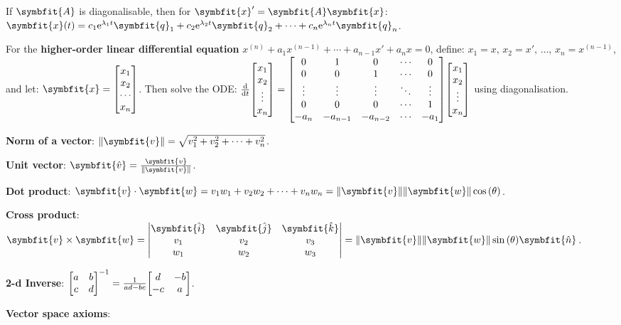 \documentclass{article}
\begin{document}
\noindent If $\symbfit{A}$ is diagonalisable, then for 
$\symbfit{x}' = \symbfit{A} \symbfit{x}$: $\symbfit{x}(t) 
= c_1 \e^{\lambda_1 t} \symbfit{q}_1 + c_2 \e^{\lambda_2 t} \symbfit{q}_2 + 
\cdots + c_n \e^{\lambda_n t} \symbfit{q}_n$.
	
\noindent For the \textbf{higher-order linear differential equation} 
$x^{\left( n \right)} + a_1 x^{\left( n-1 \right)} + \cdots + a_{n-1} x' + a_n x = 0$, 
define: $x_1 = x,\, x_2 = x',\, \dots,\, x_n = x^{\left( n-1 \right)}$, 
and let: $\symbfit{x}=\mqty[x_1 \\ x_2 \\ \cdots \\ x_n]$. Then solve 
the ODE: 
$\dv{t}\mqty[
	x_1 \\
	x_2 \\
	\vdotswithin{x_3} \\
	x_n	
] = \mqty[
	0 & 1 & 0 & \cdots & 0 \\
	0 & 0 & 1 & \cdots & 0 \\
	\vdots & \vdots & \vdots & \ddots & \vdots \\
	0 & 0 & 0 & \cdots & 1 \\
	-a_n & -a_{n-1} & -a_{n-2} & \cdots & -a_1
] \mqty[
	x_1 \\
	x_2 \\
	\vdotswithin{x_3} \\
	x_n	
]$ using diagonalisation.
\newpage

\noindent\textbf{Norm of a vector}: 
$\norm{\symbfit{v}} = \sqrt{v_1^2 + v_2^2+\dots+v_n^2}$.

\noindent\textbf{Unit vector}: 
$\symbfit{\hat{v}} = \frac{\symbfit{v}}{\norm{\symbfit{v}}}$.

\noindent\textbf{Dot product}: 
$\symbfit{v}\cdot\symbfit{w}= v_1 w_1 + v_2 w_2 + \cdots + v_n w_n 
= \norm{\symbfit{v}} \norm{\symbfit{w}} \cos{\left(\theta\right)}$.

\noindent\textbf{Cross product}: $
\symbfit{v}\times\symbfit{w} = 
\mqty|
	\symbfit{\hat{i}} & \symbfit{\hat{j}} & \symbfit{\hat{k}} \\
	v_1 & v_2 & v_3 \\
	w_1 & w_2 & w_3
| =
\norm{\symbfit{v}}\norm{\symbfit{w}}\sin{\left(\theta\right)}\symbfit{\hat{n}}
$.

\noindent\textbf{2-d Inverse}: $\mqty[a & b \\ c & d]^{-1} = \frac{1}{ad - bc} \mqty[d & -b \\ -c & a]$.

\noindent\textbf{Vector space axioms}:
\end{document}
